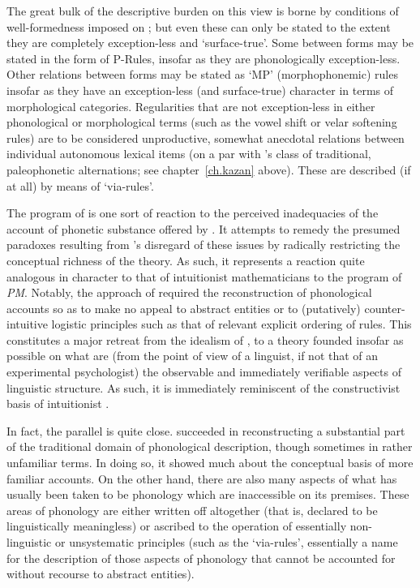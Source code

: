 The great bulk of the descriptive burden on this view is borne by
conditions of well-formedness imposed on ; but
even these can only be stated to the extent they are completely
exception-less and `surface-true'. Some  between
forms may be stated in the form of P-Rules, insofar as they are
phonologically exception-less. Other relations between forms may be
stated as `MP' (morphophonemic) rules insofar as they have an
exception-less (and surface-true) character in terms of morphological
categories. Regularities that are not exception-less in either
phonological or morphological terms (such as the  vowel shift
or velar softening rules) are to be considered unproductive, somewhat
anecdotal relations between individual autonomous lexical items (on a
par with {\Baudouin}'s class of traditional, paleophonetic alternations;
see chapter~\ref{ch.kazan} above). These are described (if at all) by
means of `via-rules'.

The program of  is one sort of reaction to
the perceived inadequacies of the account of phonetic substance
offered by \textsl{}. It attempts to remedy the presumed paradoxes
resulting from \textsl{}'s disregard of these issues by radically
restricting the conceptual richness of the theory. As such, it
represents a reaction quite analogous in character to that of
intuitionist mathematicians to the program of \textsl{PM}. Notably,
the approach of  required the
reconstruction of phonological accounts so as to make no appeal to
abstract entities or to (putatively) counter-intuitive logistic
principles such as that of relevant explicit ordering of rules. This
constitutes a major retreat from the idealism of \textsl{}, to a
theory founded insofar as possible on what are (from the point of view
of a linguist, if not that of an experimental psychologist) the
observable and immediately verifiable aspects of linguistic
structure. As such, it is immediately reminiscent of the
constructivist basis of intuitionist .

In fact, the parallel is quite close. 
succeeded in reconstructing a substantial part of the traditional
domain of phonological description, though sometimes in rather
unfamiliar terms. In doing so, it showed much about the conceptual
basis of more familiar accounts. On the other hand, there are also
many aspects of what has usually been taken to be phonology which are
inaccessible on its premises. These areas of phonology are either
written off altogether (that is, declared to be linguistically
meaningless) or ascribed to the operation of essentially non-linguistic
or unsystematic principles (such as the `via-rules', essentially a
name for the description of those aspects of phonology that cannot be
accounted for without recourse to abstract entities).

